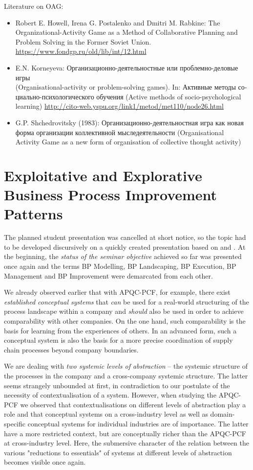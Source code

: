 \documentclass[11pt,a4paper]{article}
\begin{document}
Literature on OAG:
\begin{itemize}
\item Robert E. Howell, Irena G. Postalenko and Dmitri M. Rabkine: The
  Organizational-Activity Game as a Method of Collaborative Planning and
  Problem Solving in the Former Soviet Union.
  \url{https://www.fondgp.ru/old/lib/int/12.html}
\item E.N. Korneyeva: \foreignlanguage{russian}{Организационно-деятельностные
  или проблемно-деловые игры}\\ (Organisational-activity or problem-solving
  games). In: \foreignlanguage{russian}{Активные методы
    социально-психологического обучения} (Active methods of
  socio-psychological learning)
  \url{http://cito-web.yspu.org/link1/metod/met110/node26.html}
\item G.P. Shchedrovitsky (1983):
  \foreignlanguage{russian}{Организационно-деятельностная игра как новая форма
    организации коллективной мыследеятельности} (Organisational Activity Game
  as a new form of organisation of collective thought activity)
\end{itemize}

\section{Exploitative and Explorative Business Process Improvement Patterns}

The planned student presentation was cancelled at short notice, so the topic
had to be developed discursively on a quickly created presentation based on
\cite{Lindskog2018} and \cite{Rosemann2020}. At the beginning, the
\emph{status of the seminar objective} achieved so far was presented once
again and the terms BP Modelling, BP Landscaping, BP Execution, BP Management
and BP Improvement were demarcated from each other.

We already observed earlier that with APQC-PCF, for example, there exist
\emph{established conceptual systems} that \emph{can} be used for a real-world
structuring of the process landscape within a company and \emph{should} also
be used in order to achieve comparability with other companies. On the one
hand, such comparability is the basis for learning from the experiences of
others. In an advanced form, such a conceptual system is also the basis for a
more precise coordination of supply chain processes beyond company boundaries.

We are dealing with \emph{two systemic levels of abstraction} -- the systemic
structure of the processes in the company and a cross-company systemic
structure. The latter seems strangely unbounded at first, in contradiction to
our postulate of the necessity of contextualisation of a system. However, when
studying the APQC-PCF we observed that contextualisations on different levels
of abstraction play a role and that conceptual systems on a cross-industry
level as well as domain-specific conceptual systems for individual industries
are of importance. The latter have a more restricted context, but are
conceptually richer than the APQC-PCF at cross-industry level. Here, the
submersive character of the relation between the various "reductions to
essentials" of systems at different levels of abstraction becomes visible once
again.
\end{document}
